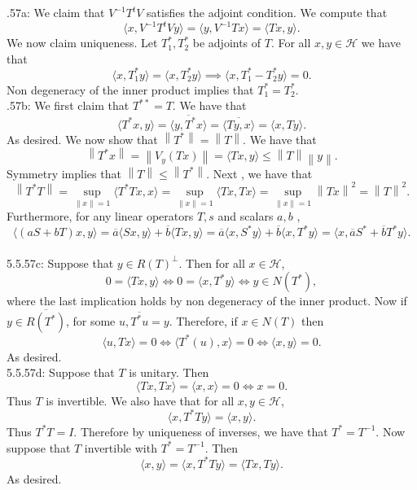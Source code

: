 \documentclass[letterpaper]{article}
\newcommand{\lan}{\langle}
\newcommand{\ran}{\rangle}
\newcommand{\norm}[1]{\left\lVert#1\right\rVert}
\newcommand{\inn}[1]{\lan#1\ran}
\newcommand{\ol}{\overline}
\begin{document}
 .57a: We claim that $V^{-1} T^{t} V$ satisfies the adjoint condition. 
We compute that $$\inn{x, V^{-1} T^{t} V y} = \inn{y, V^{-1} Tx} = \inn{Tx, y}. $$
We now claim uniqueness. Let $T^\ast_1, T^\ast_2$ be adjoints of $T$. For all $x,y\in \mathcal{H}$ we have that $$\inn{x,T^\ast_1 y} = \inn{x,T^\ast_2 y} \implies \inn{x,T^\ast_1 - T^\ast_2 y} = 0.$$
Non degeneracy of the inner product implies that $T_1^\ast = T_2^\ast$. 
\\ .57b: We first claim that $T^{\ast \ast} = T$. We have that $$\inn{T^\ast x,y} = \ol{\inn{y, T^\ast x}} = \ol{\inn{Ty, x}} = \inn{x,Ty}.$$
As desired. We now show that $\norm{T^\ast} = \norm{T}.$ We have that $$\norm{T^\ast x} = \norm{V_y(Tx)} = \inn{Tx,y} \leq \norm{T}\norm{y}.$$
Symmetry implies that $\norm{T}\leq \norm{T^\ast}. $ Next , we have that $$\norm{T^\ast T} = \sup_{\norm{x} = 1} \inn{T^\ast T x, x} = \sup_{\norm{x} = 1} \inn{Tx,Tx} = \sup_{\norm{x} = 1} \norm{Tx}^2 = \norm{T}^2.$$
Furthermore, for any linear operators $T,s$ and scalars $a,b$ , $$\inn{(aS+bT)x,y}  = \ol{a} \inn{Sx,y} + \ol{b} \inn{Tx,y} =\ol{a} \inn{x,S^\ast y} + \ol{b} \inn{x,T^\ast y} = \inn{x, \ol{a}S^\ast + \ol{b} T^\ast y}. $$
\newline \\ 5.5.57c: Suppose that $y\in R(T)^\perp$. Then for all $x \in \mathcal{H}$, $$ 0 = \inn{Tx,y} \iff 0 = \inn{x,T^\ast y} \iff y\in N(T^\ast),$$ where the last implication holds by non degeneracy of the inner product.
Now if $y\in \ol{R(T^\ast)}$, for some $u, \ol{T^\ast u} = y$. Therefore, if $x\in N(T)$ then $$ \inn{u, Tx} = 0 \iff \inn{T^\ast(u), x } = 0 \iff \inn{x,y} = 0.$$
As desired. 
\newline \\ 5.5.57d: Suppose that $T$ is unitary. Then $$ \inn{Tx,Tx} = \inn{x,x} = 0 \iff x= 0. $$ Thus $T$ is invertible. We also have that for all $x,y\in \mathcal{H}$, $$\inn{x,T^\ast T y} = \inn{x,y}.$$ Thus $T^\ast T = I$.
Therefore by uniqueness of inverses, we have that $T^\ast = T^{-1}.$ Now suppose that $T$ invertible with $T^\ast = T^{-1}$. Then $$\inn{x,y} = \inn{x, T^\ast T y} = \inn{Tx,Ty}. $$ As desired.  
\end{document}
